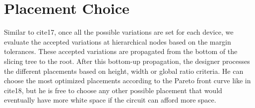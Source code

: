 \section{Placement Choice}
Similar to cite{17}, once all the possible variations are set for each device, we evaluate the accepted variations at hierarchical nodes based on the margin tolerances. These accepted variations are propagated from the bottom of the slicing tree to the root. After this bottom-up propagation, the designer processes the different placements based on height, width or global ratio criteria. He can choose the most optimized placements according to the Pareto front curve like in cite{18}, but he is free to choose any other possible placement that would eventually have more white space if the circuit can afford more space.